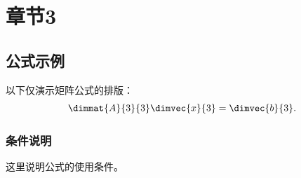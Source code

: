 \chapter{章节3}
\label{chap:chapter3}

\section{公式示例}
以下仅演示矩阵公式的排版：
\begin{equation}
  \dimmat{A}{3}{3}\dimvec{x}{3}=\dimvec{b}{3}.
  \label{eq:linear-model}
\end{equation}

\subsection{条件说明}
这里说明公式的使用条件。
